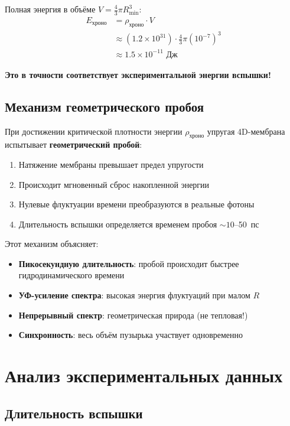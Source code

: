 \documentclass[12pt,a4paper]{article}
\begin{document}
Полная энергия в объёме $V = \frac{4}{3}\pi R_{\text{min}}^3$:
\begin{align}
E_{\text{хроно}} &= \rho_{\text{хроно}} \cdot V \nonumber \\
&\approx (1.2 \times 10^{31}) \cdot \frac{4}{3}\pi (10^{-7})^3 \nonumber \\
&\approx 1.5 \times 10^{-11} \text{ Дж}
\end{align}

\textbf{Это в точности соответствует экспериментальной энергии вспышки!}

\subsection{Механизм геометрического пробоя}

При достижении критической плотности энергии $\rho_{\text{хроно}}$ упругая 4D-мембрана испытывает \textbf{геометрический пробой}:
\begin{enumerate}
    \item Натяжение мембраны превышает предел упругости
    \item Происходит мгновенный сброс накопленной энергии
    \item Нулевые флуктуации времени преобразуются в реальные фотоны
    \item Длительность вспышки определяется временем пробоя $\sim 10$--50~пс
\end{enumerate}

Этот механизм объясняет:
\begin{itemize}
    \item \textbf{Пикосекундную длительность}: пробой происходит быстрее гидродинамического времени
    \item \textbf{УФ-усиление спектра}: высокая энергия флуктуаций при малом $R$
    \item \textbf{Непрерывный спектр}: геометрическая природа (не тепловая!)
    \item \textbf{Синхронность}: весь объём пузырька участвует одновременно
\end{itemize}

\section{Анализ экспериментальных данных}
\label{sec:experiments}

\subsection{Длительность вспышки}
\end{document}
